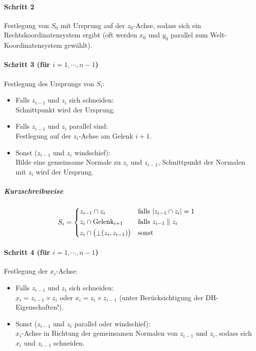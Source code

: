 				\paragraph{Schritt 2}
					Festlegung von \(S_0\) mit Ursprung auf der \(z_0\)-Achse, sodass sich ein Rechtskoordinatensystem ergibt (oft werden \(x_0\) und \(y_0\) parallel zum Welt-Koordinatensystem gewählt).
				
				\paragraph{Schritt 3 (für \( i = 1, \cdots, n - 1 \))}
					Festlegung des Ursprungs von \(S_i\):
					\begin{itemize}
						\item Falls \(z_{i - 1}\) und \(z_i\) sich schneiden: \\ Schnittpunkt wird der Ursprung.
						\item Falls \(z_{i - 1}\) und \(z_i\) parallel sind: \\ Festlegung auf der \(z_i\)-Achse am Gelenk \(i + 1\).
						\item Sonst (\(z_{i - 1}\) und \(z_i\) windschief): \\ Bilde eine gemeinsame Normale zu \(z_i\) und \(z_{i - 1}\), Schnittpunkt der Normalen mit \(z_i\) wird der Ursprung.
					\end{itemize}
				
					\subparagraph{Kurzschreibweise}
					\begin{equation*}
						S_i =
							\begin{cases*}
								z_{i - 1} \cap z_i & falls \( \lvert z_{i - 1} \cap z_i \rvert = 1 \) \\
								z_i \cap \text{Gelenk}_{i + 1} & falls \( z_{i - 1} \parallel z_i \) \\
								z_i \cap \big(\raisebox{-1pt}{\(\bot\)}(z_i, z_{i - 1})\big) & sonst
							\end{cases*}
					\end{equation*}
				
				\paragraph{Schritt 4 (für \( i = 1, \cdots, n - 1 \))}
					Festlegung der \(x_i\)-Achse:
					\begin{itemize}
						\item Falls \(z_{i - 1}\) und \(z_i\) sich schneiden: \\ \( x_i = z_{i - 1} \times z_i \) oder \( x_i = z_i \times z_{i - 1} \) (unter Berücksichtigung der DH-Eigenschaften!).
						\item Sonst (\(z_{i - 1}\) und \(z_i\) parallel oder windschief): \\ \(x_i\)-Achse in Richtung der gemeinsamen Normalen von \(z_{i - 1}\) und \(z_i\), sodass sich \(x_i\) und \(z_{i - 1}\) schneiden.
					\end{itemize}
				
